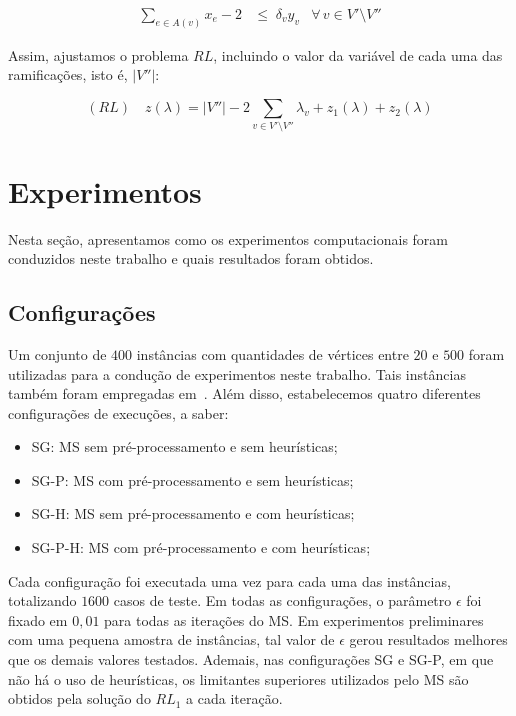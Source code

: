 \documentclass[12pt, a4paper]{article}
\theoremstyle{plain}
\theoremstyle{definition}
\theoremstyle{remark}
\begin{document}
{\abovedisplayskip=0pt
	\begin{align}
		\displaystyle\sum_{e \in A(v)} x_e - 2 &\leq \; \delta_v y_v &\forall \, v \in V' \setminus V'' \label{ramification3}
	\end{align}
}

Assim, ajustamos o problema $RL$, incluindo o valor da variável de cada uma das ramificações, isto é, $|V''|$:

\begin{equation} \label{rl_mod_pre}
	(RL) \quad z(\lambda) = |V''| -2 \sum_{v \in V' \setminus V''}\lambda_v + z_1(\lambda) + z_2(\lambda)
\end{equation}

\section{Experimentos}

Nesta seção, apresentamos como os experimentos computacionais foram conduzidos neste trabalho e quais resultados foram obtidos.
 
\subsection{Configurações}

Um conjunto de $400$ instâncias com quantidades de vértices entre $20$ e $500$ foram utilizadas para a condução de experimentos neste trabalho. Tais instâncias também foram empregadas em~\cite{Carrabs2013}. Além disso, estabelecemos quatro diferentes configurações de execuções, a saber:

\begin{itemize}[before=\vspace{\baselineskip},after=\vspace{\baselineskip}]
\item SG: MS sem pré-processamento e sem heurísticas;
\item SG-P: MS com pré-processamento e sem heurísticas;
\item SG-H: MS sem pré-processamento e com heurísticas;
\item SG-P-H: MS com pré-processamento e com heurísticas;
\end{itemize}

Cada configuração foi executada uma vez para cada uma das instâncias, totalizando $1600$ casos de teste. Em todas as configurações, o parâmetro $\epsilon$ foi fixado em $0,01$ para todas as iterações do MS. Em experimentos preliminares com uma pequena amostra de instâncias, tal valor de $\epsilon$ gerou resultados melhores que os demais valores testados. Ademais, nas configurações SG e SG-P, em que não há o uso de heurísticas, os limitantes superiores utilizados pelo MS são obtidos pela solução do $RL_1$ a cada iteração.
\end{document}
